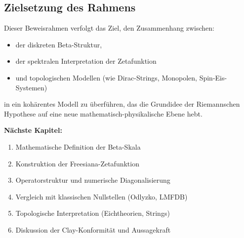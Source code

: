 \documentclass[12pt,a4paper]{article}
\begin{document}
\subsection*{Zielsetzung des Rahmens}

Dieser Beweisrahmen verfolgt das Ziel, den Zusammenhang zwischen:
\begin{itemize}[itemsep=2pt]
  \item der diskreten Beta-Struktur,
  \item der spektralen Interpretation der Zetafunktion
  \item und topologischen Modellen (wie Dirac-Strings, Monopolen, Spin-Eis-Systemen)
\end{itemize}
in ein kohärentes Modell zu überführen, das die Grundidee der Riemannschen Hypothese auf eine neue mathematisch-physikalische Ebene hebt.

\vspace{1em}
\textbf{Nächste Kapitel:}
\begin{enumerate}
    \item Mathematische Definition der Beta-Skala
    \item Konstruktion der Freesiana-Zetafunktion
    \item Operatorstruktur und numerische Diagonalisierung
    \item Vergleich mit klassischen Nullstellen (Odlyzko, LMFDB)
    \item Topologische Interpretation (Eichtheorien, Strings)
    \item Diskussion der Clay-Konformität und Aussagekraft
\end{enumerate}
\end{document}
